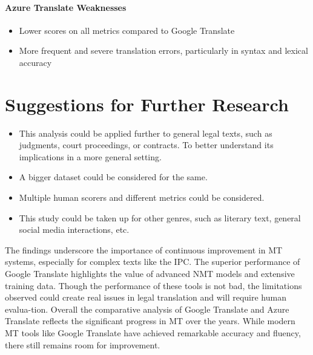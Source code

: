  \paragraph{Azure Translate Weaknesses}
 \begin{itemize}
     \item Lower scores on all metrics compared to Google Translate
     \item More frequent and severe translation errors, particularly in syntax and lexical accuracy
 \end{itemize}

\section{Suggestions for Further Research}

\begin{itemize}
    \item This analysis could be applied further to general legal texts, such as judgments, court proceedings, or contracts. To better understand its implications in a more general setting.
    \item A bigger dataset could be considered for the same.
    \item Multiple human scorers and different metrics could be considered.
    \item This study could be taken up for other genres, such as literary text, general social media interactions, etc.
\end{itemize}

 The findings underscore the importance of continuous improvement in MT systems, especially for complex texts like the IPC. The superior performance of Google Translate highlights the value of advanced NMT models and extensive training data. Though the performance of these tools is not bad, the limitations observed could create real issues in legal translation and will require human evalua-tion. Overall the comparative analysis of Google Translate and Azure Translate reflects the significant progress in MT over the years. While modern MT tools like Google Translate have achieved remarkable accuracy and fluency, there still remains room for improvement.
